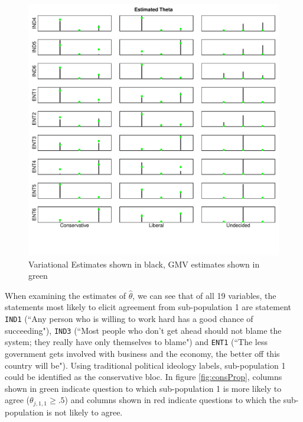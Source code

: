 \documentclass{article}\usepackage[]{graphicx}\usepackage[]{color}
\makeatletter
\def\maxwidth{ %
  \ifdim\Gin@nat@width>\linewidth
    \linewidth
  \else
    \Gin@nat@width
  \fi
}
\newenvironment{knitrout}{}{} %
\renewenvironment{knitrout}{\begin{singlespace}}{\end{singlespace}}
\makeatother
\begin{document}
\begin{knitrout}
\begin{figure}
{\centering \includegraphics[width=\maxwidth]{figure/thetaPlot-2} 

}

\caption[Variational Estimates shown in black, GMV estimates shown in green]{Variational Estimates shown in black, GMV estimates shown in green\label{fig:thetaPlot2}}
\end{figure}


\end{knitrout}

When examining the estimates of $\hat \theta$, we can see that of all 19 variables, the statements most likely to elicit agreement from sub-population 1 are statement \texttt{IND1} (``Any person who is willing to work hard has a good chance of succeeding"), \texttt{IND3} (``Most people who don't get ahead should not blame the system; they really have only themselves to blame") and \texttt{ENT1} (``The less government gets involved with business and the economy, the better off this country will be"). Using traditional political ideology labels, sub-population 1 could be identified as the conservative bloc. In figure \ref{fig:consProp}, columns shown in green indicate question to which sub-population 1 is more likely to agree ($\theta_{j,1,1} \geq .5$) and columns shown in red indicate questions to which the sub-population is not likely to agree.
\end{document}
